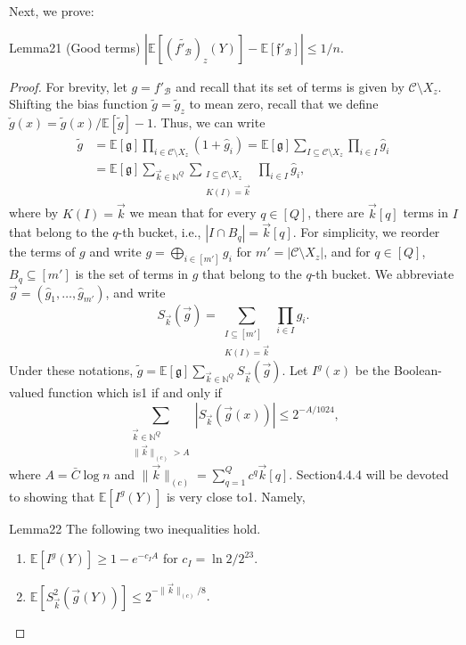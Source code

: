 Next, we prove:
\begin{authorclaim}{Lemma21 (Good terms)}
$|\mathbb E[(\widetilde{f'_{\mathcal B}})_z(Y)]-\mathbb E[\mathfrak f'_{\mathcal B}]|\le1/n$.
\end{authorclaim}
\begin{proof}
For brevity, let $g=f'_{\mathcal B}$ and recall that its set of terms is given by $\mathcal C\setminus X_z$. Shifting the bias function $\widetilde g=\widetilde g_z$ to mean zero, recall that we define $\check g(x)=\widetilde g(x)/\mathbb E[\widetilde g]-1$.
Thus, we can write
\begin{align*}
\widetilde g
&=\mathbb E[\mathfrak g]\prod_{i\in\mathcal C\setminus X_z}(1+\widehat g_i)
=\mathbb E[\mathfrak g]\sum_{I\subseteq\mathcal C\setminus X_z}\prod_{i\in I}\widehat g_i\\
&=\mathbb E[\mathfrak g]\sum_{\vec k\in\mathbb N^Q}
\sum_{\substack{I\subseteq\mathcal C\setminus X_z\\K(I)=\vec k}}\prod_{i\in I}\widehat g_i,
\end{align*}
where by $K(I)=\vec k$ we mean that for every $q\in[Q]$, there are $\vec k[q]$ terms in $I$ that belong to the $q$-th bucket, i.e., $|I\cap B_q|=\vec k[q]$. For simplicity, we reorder the terms of $g$ and write $g=\bigoplus_{i\in[m']}g_i$ for $m'=|\mathcal C\setminus X_z|$, and for $q\in[Q]$, $B_q\subseteq[m']$ is the set of terms in $g$ that belong to the $q$-th bucket. We abbreviate $\vec g=(\widehat g_1,\ldots,\widehat g_{m'})$, and write
\[
S_{\vec k}(\vec g)=\sum_{\substack{I\subseteq[m']\\K(I)=\vec k}}\prod_{i\in I}\widehat g_i.
\]
Under these notations, $\widetilde g=\mathbb E[\mathfrak g]\sum_{\vec k\in\mathbb N^Q}S_{\vec k}(\vec g)$.
Let $I^g(x)$ be the Boolean-valued function which is1 if and only if
\[
\sum_{\substack{\vec k\in\mathbb N^Q\\\|\vec k\|_{(c)}>A}}|S_{\vec k}(\vec g(x))|\le2^{-A/1024},
\]
where $A=\bar C\log n$ and $\|\vec k\|_{(c)}=\sum_{q=1}^Qc^q\vec k[q]$. Section4.4.4 will be devoted to showing that $\mathbb E[I^g(Y)]$ is very close to1. Namely,
\begin{authorclaim}{Lemma22}
The following two inequalities hold.
\begin{enumerate}
\item $\mathbb E[I^g(Y)]\ge1-e^{-c_IA}$ for $c_I=\ln2/2^{23}$.
\item $\mathbb E[S_{\vec k}^2(\vec g(Y))]\le2^{-\|\vec k\|_{(c)}/8}$.
\end{enumerate}
\end{authorclaim}

\end{proof}
